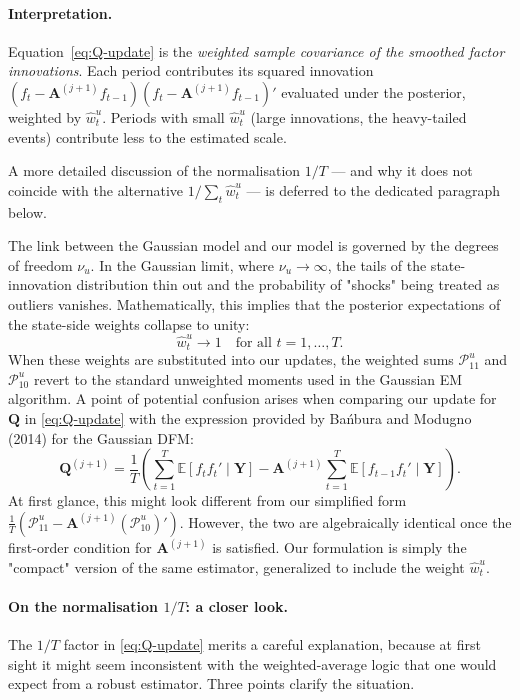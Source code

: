 \documentclass[11pt, a4paper, oneside]{article}
\newcommand{\mA}{\mathbf{A}}
\begin{document}
\paragraph{Interpretation.}
Equation~\eqref{eq:Q-update} is the \emph{weighted sample covariance
of the smoothed factor innovations}. Each period contributes its
squared innovation $(f_t - \mA^{(j+1)} f_{t-1})(f_t - \mA^{(j+1)} f_{t-1})'$
evaluated under the posterior, weighted by $\hat{w}^u_t$. Periods
with small $\hat{w}^u_t$ (large innovations, the heavy-tailed events)
contribute less to the estimated scale.

A more detailed discussion of the normalisation $1/T$ — and why it
does not coincide with the alternative $1/\sum_t \hat{w}^u_t$ — is
deferred to the dedicated paragraph below.

The link between the Gaussian model and our model is governed by the degrees of freedom $\nu_u$. In the Gaussian limit, where $\nu_u \to \infty$, the tails of the state-innovation distribution thin out and the probability of "shocks" being treated as outliers vanishes. 
Mathematically, this implies that the posterior expectations of the state-side weights collapse to unity:\begin{equation}\hat{w}^u_t \to 1 \quad \text{for all } t=1, \dots, T.\end{equation}When these weights are substituted into our updates, the weighted sums $\mathcal{P}_{11}^u$ and $\mathcal{P}_{10}^u$ revert to the standard unweighted moments used in the Gaussian EM algorithm.
A point of potential confusion arises when comparing our update for $\mathbf{Q}$ in \eqref{eq:Q-update} with the expression provided by Bańbura and Modugno (2014) for the Gaussian DFM:\begin{equation}\mathbf{Q}^{(j+1)} = \frac{1}{T} \left( \sum_{t=1}^T \mathbb{E}[f_t f_t' \mid \mathbf{Y}] - \mathbf{A}^{(j+1)} \sum_{t=1}^T \mathbb{E}[f_{t-1} f_t' \mid \mathbf{Y}] \right).\label{eq:BM-formula}\end{equation}At first glance, this might look different from our simplified form $\frac{1}{T} (\mathcal{P}_{11}^u - \mathbf{A}^{(j+1)}(\mathcal{P}_{10}^u)')$. However, the two are algebraically identical once the first-order condition for $\mathbf{A}^{(j+1)}$ is satisfied. Our formulation is simply the "compact" version of the same estimator, generalized to include the weight $\hat{w}^u_t$.


\paragraph{On the normalisation $1/T$: a closer look.}
The $1/T$ factor in \eqref{eq:Q-update} merits a careful explanation,
because at first sight it might seem inconsistent with the
weighted-average logic that one would expect from a robust estimator.
Three points clarify the situation.
\end{document}
